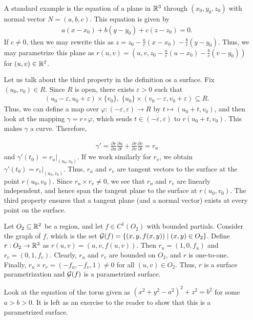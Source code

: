 A standard example is the equation of a plane in $\mathbb{R}^{3}$ through $(x_{0},y_{0},z_{0})$ with normal vector $N = (a,b,c)$. This equation is given by
\begin{align}
    a(x-x_{0}) + b(y-y_{0}) + c(z-z_{0}) = 0.
\end{align}
If $c \neq 0$, then we may rewrite this as $z = z_{0} - \frac{a}{c}(x-x_{0}) - \frac{b}{c}(y-y_{0})$. Thus, we may parametrize this plane as $r(u,v) = (u,v,z_{0} - \frac{a}{c}(u-x_{0}) - \frac{b}{c}(v-y_{0}))$ for $(u,v) \in \mathbb{R}^{2}$.

Let us talk about the third property in the definition os a surface. Fix $(u_{0},v_{0}) \in R$. Since $R$ is open, there exists $\varepsilon > 0$ such that
\begin{align}
    (u_{0}-\varepsilon,u_{0}+\varepsilon) \times \{v_{0}\},\;\{u_{0}\} \times (v_{0}-\varepsilon,v_{0}+\varepsilon) \subseteq R.
\end{align}
Thus, we can define a map over $\varphi:(-\varepsilon,\varepsilon) \to R$ by $t \mapsto (u_{0}+t,v_{0})$, and then look at the mapping $\gamma = r \circ \varphi$, which sends $t \in (-\varepsilon,\varepsilon)$ to $r(u_{0}+t,v_{0})$. This makes $\gamma$ a curve. Therefore,

\begin{align}
    \gamma' = \frac{\partial r}{\partial u} \frac{\partial u}{\partial t} + \frac{\partial r}{\partial v} \frac{\partial v}{\partial t} = r_{u}
\end{align}
and $\gamma'(t_{0}) = r_{u}|_{(u_{0},v_{0})}$. If we work similarly for $r_{v}$, we obtain $\gamma'(t_{0}) = r_{v}|_{(u_{0},v_{0})}$. Thus, $r_{u}$ and $r_{v}$ are tangent vectors to the surface at the point $r(u_{0},v_{0})$. Since $r_{u} \times r_{v} \neq 0$, we see that $r_{u}$ and $r_{v}$ are linearly independent, and hence span the tangent plane to the surface at $r(u_{0},v_{0})$. The third property ensures that a tangent plane (and a normal vector) exists at every point on the surface.

\begin{example}
    Let $O_{2} \subseteq \mathbb{R}^{2}$ be a region, and let $f \in C^{1}(O_{2})$ with bounded partials. Consider the graph of $f$, which is the set $\mathcal{G}(f) = \{(x,y,f(x,y)) \mid (x,y) \in O_{2}\}$. Define $r:O_{2} \to \mathbb{R}^{3}$ as $r(u,v) = (u,v,f(u,v))$. Then $r_{u} = (1,0,f_{u})$ and $r_{v} = (0,1,f_{v})$. Clearly, $r_{u}$ and $r_{v}$ are bounded on $O_{2}$, and $r$ is one-to-one. Finally, $r_{u} \times r_{v} = (-f_{u},-f_{v},1) \neq 0$ for all $(u,v) \in O_{2}$. Thus, $r$ is a surface parametrization and $\mathcal{G}(f)$ is a parametrized surface.
\end{example}

\begin{example}
    Look at the equation of the torus given as $(x^{2}+y^{2}-a^{2})^{2}+z^{2} = b^{2}$ for some $a > b > 0$. It is left as an exercise to the reader to show that this is a parametrized surface.
\end{example}